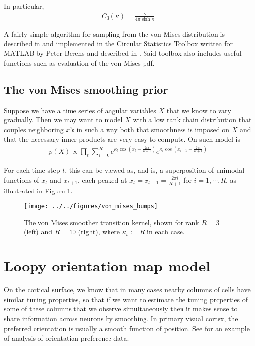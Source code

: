 \documentclass[11pt]{article}
\newcommand{\paperlink}[1]{\href{../../../../papers/#1.pdf}{\cite{#1}}}
\begin{document}
\noindent In particular,
%
\begin{align*}
C_3(\kappa)=\frac{\kappa}{4\pi\sinh\kappa}
\end{align*}

A fairly simple algorithm for sampling from the von Mises distribution is described in \paperlink{Best_1979} and implemented in the Circular Statistics Toolbox written for MATLAB by Peter Berens and described in \paperlink{Berens_2009}. Said toolbox also includes useful functions such as evaluation of the von Mises pdf.

\subsection{The von Mises smoothing prior}

Suppose we have a time series of angular variables $X$ that we know to vary gradually. Then we may want to model $X$ with a low rank chain distribution that couples neighboring $x$'s in such a way both that smoothness is imposed on $X$ and that the necessary inner products are very easy to compute. On such model is
%
\begin{align*}
p(X)\propto\prod_t\sum_{i=0}^Re^{\kappa_t\cos\left(x_t-\frac{2\pi i}{R+1}\right)}e^{\kappa_t\cos\left(x_{t+1}-\frac{2\pi i}{R+1}\right)}
\end{align*}

\noindent For each time step $t$, this can be viewed as, and is, a superposition of unimodal functions of $x_t$ and $x_{t+1}$, each peaked at $x_t=x_{t+1}=\frac{2\pi i}{R+1}$ for $i=1,\cdots,R$, as illustrated in Figure \ref{fig:von_mises_bumps}.

\begin{figure}[h]
\centering
\texttt{[image: ../../figures/von\_mises\_bumps]}
\caption{The von Mises smoother transition kernel, shown for rank $R=3$ (left) and $R=10$ (right), where $\kappa_t:=R$ in each case.}
\label{fig:von_mises_bumps}
\end{figure}

\section{Loopy orientation map model}
\label{sec:loopy_orientation_map_model}

On the cortical surface, we know that in many cases nearby columns of cells have similar tuning properties, so that if we want to estimate the tuning properties of some of these columns that we observe simultaneously then it makes sense to share information across neurons by smoothing.  In primary visual cortex, the preferred orientation is usually a smooth function of position. See \paperlink{Ohki_2006} for an example of analysis of orientation preference data. 
\end{document}
